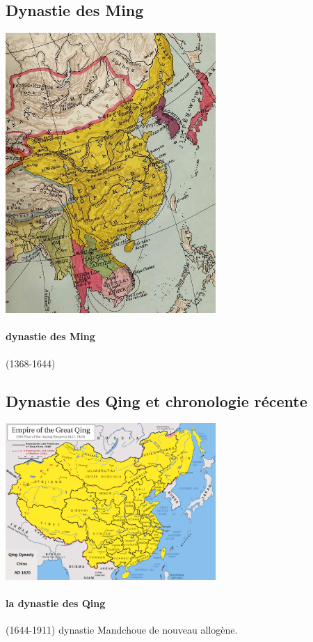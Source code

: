\subsection{Dynastie des Ming}
\includegraphics[width=0.6\textwidth]{ConfucianismeTaoismeBouddhismeChinois/Images/CarteMing.jpg}
\paragraph{dynastie des Ming} (1368-1644)


\subsection{Dynastie des Qing et chronologie récente}

\includegraphics[width=0.6\textwidth]{ConfucianismeTaoismeBouddhismeChinois/Images/CarteQing.png}
\paragraph{la dynastie des Qing}  (1644-1911) dynastie Mandchoue de nouveau allogène. 


